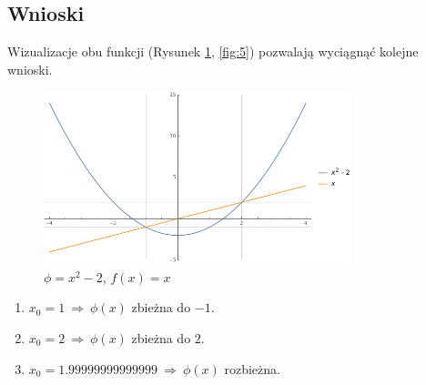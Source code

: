\documentclass{classrep}
\begin{document}
	\subsection{Wnioski}
		
		Wizualizacje obu funkcji (Rysunek \ref{fig:4}, \ref{fig:5}) pozwalają wyciągnąć kolejne wnioski.
		\begin{figure}[htbp]
			\centering
			\includegraphics[width=0.8\textwidth]{zad6/Myplot1.png}
  			\caption{$\phi=x^2-2$, $f(x)=x$}
  			\label{fig:4}
		\end{figure}	
		
		\begin{enumerate}[1.]
			\item $x_0 = 1 ~\Rightarrow~ \phi(x)$ zbieżna do $-1$.
			\item $x_0 = 2 ~\Rightarrow~ \phi(x)$ zbieżna do $2$.
			\item $x_0 = 1.99999999999999 ~\Rightarrow~ \phi(x)$ rozbieżna.
		\end{enumerate}
		
\end{document}
